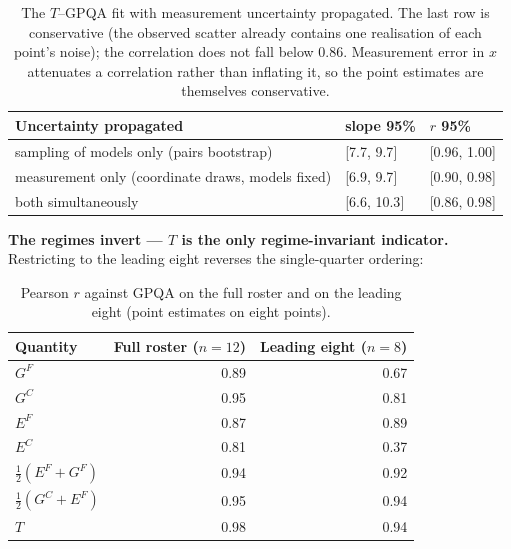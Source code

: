 \documentclass{article}
\begin{document}
\begin{table}[H]
\caption{The \(T\)--GPQA fit with measurement uncertainty propagated. The last row is conservative (the observed scatter already contains one realisation of each point's noise); the correlation does not fall below 0.86. Measurement error in \(x\) attenuates a correlation rather than inflating it, so the point estimates are themselves conservative.}
\begin{center}\small
\begin{tabular}{@{}lll@{}}
\toprule\noalign{}
Uncertainty propagated & slope 95\% & \(r\) 95\% \\
\midrule\noalign{}
sampling of models only (pairs bootstrap) & {[}7.7, 9.7{]} & {[}0.96, 1.00{]} \\
measurement only (coordinate draws, models fixed) & {[}6.9, 9.7{]} & {[}0.90, 0.98{]} \\
both simultaneously & {[}6.6, 10.3{]} & {[}0.86, 0.98{]} \\
\bottomrule
\end{tabular}
\end{center}
\end{table}

\textbf{The regimes invert --- \(T\) is the only regime-invariant indicator.} Restricting to the leading eight reverses the single-quarter ordering:

\begin{table}[H]
\caption{Pearson \(r\) against GPQA on the full roster and on the leading eight (point estimates on eight points).}
\begin{center}\small
\begin{tabular}{@{}lrr@{}}
\toprule\noalign{}
Quantity & Full roster (\(n=12\)) & Leading eight (\(n=8\)) \\
\midrule\noalign{}
\(G^{F}\) &\cellcolor[HTML]{22318D}\textcolor[HTML]{EEF3F8}{0.89}&\cellcolor[HTML]{1F7FB7}\textcolor[HTML]{EEF3F8}{0.67} \\
\(G^{C}\) &\cellcolor[HTML]{142670}\textcolor[HTML]{EEF3F8}{0.95}&\cellcolor[HTML]{234A9E}\textcolor[HTML]{EEF3F8}{0.81} \\
\(E^{F}\) &\cellcolor[HTML]{253695}\textcolor[HTML]{EEF3F8}{0.87}&\cellcolor[HTML]{22318D}\textcolor[HTML]{EEF3F8}{0.89} \\
\(E^{C}\) &\cellcolor[HTML]{234A9E}\textcolor[HTML]{EEF3F8}{0.81}&\cellcolor[HTML]{82CEBB}\textcolor[HTML]{1A1A1A}{0.37} \\
\(\tfrac12(E^{F}+G^{F})\) &\cellcolor[HTML]{162875}\textcolor[HTML]{EEF3F8}{0.94}&\cellcolor[HTML]{1B2C7E}\textcolor[HTML]{EEF3F8}{0.92} \\
\(\tfrac12(G^{C}+E^{F})\) &\cellcolor[HTML]{142670}\textcolor[HTML]{EEF3F8}{0.95}&\cellcolor[HTML]{162875}\textcolor[HTML]{EEF3F8}{0.94} \\
\(T\) &\cellcolor[HTML]{0D2162}\textcolor[HTML]{EEF3F8}{0.98}&\cellcolor[HTML]{162875}\textcolor[HTML]{EEF3F8}{0.94} \\
\bottomrule
\end{tabular}
\end{center}
\end{table}
\end{document}
